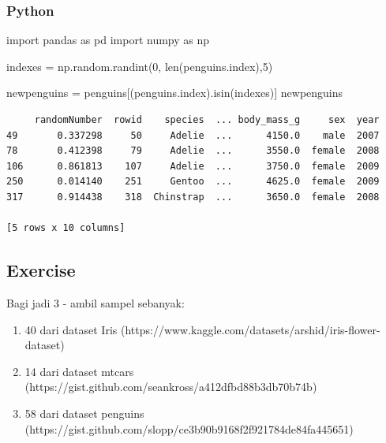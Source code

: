 \documentclass[
  letterpaper,
  DIV=11,
  numbers=noendperiod]{scrreprt}
\newenvironment{Shaded}{\begin{snugshade}}{\end{snugshade}}
\newcommand{\BuiltInTok}[1]{\textcolor[rgb]{0.00,0.23,0.31}{#1}}
\newcommand{\DecValTok}[1]{\textcolor[rgb]{0.68,0.00,0.00}{#1}}
\newcommand{\ImportTok}[1]{\textcolor[rgb]{0.00,0.46,0.62}{#1}}
\newcommand{\NormalTok}[1]{\textcolor[rgb]{0.00,0.23,0.31}{#1}}
\newcommand{\OperatorTok}[1]{\textcolor[rgb]{0.37,0.37,0.37}{#1}}
\providecommand{\tightlist}{%
  \setlength{\itemsep}{0pt}\setlength{\parskip}{0pt}}\usepackage{longtable,booktabs,array}
\begin{document}
\hypertarget{python-4}{%
\subsubsection{Python}\label{python-4}}

\begin{Shaded}
\begin{Highlighting}[]
\ImportTok{import}\NormalTok{ pandas }\ImportTok{as}\NormalTok{ pd}
\ImportTok{import}\NormalTok{ numpy }\ImportTok{as}\NormalTok{ np}

\NormalTok{indexes }\OperatorTok{=}\NormalTok{ np.random.randint(}\DecValTok{0}\NormalTok{, }\BuiltInTok{len}\NormalTok{(penguins.index),}\DecValTok{5}\NormalTok{)}

\NormalTok{newpenguins }\OperatorTok{=}\NormalTok{ penguins[(penguins.index).isin(indexes)]}
\NormalTok{newpenguins}
\end{Highlighting}
\end{Shaded}

\begin{verbatim}
     randomNumber  rowid    species  ... body_mass_g     sex  year
49       0.337298     50     Adelie  ...      4150.0    male  2007
78       0.412398     79     Adelie  ...      3550.0  female  2008
106      0.861813    107     Adelie  ...      3750.0  female  2009
250      0.014140    251     Gentoo  ...      4625.0  female  2009
317      0.914438    318  Chinstrap  ...      3650.0  female  2008

[5 rows x 10 columns]
\end{verbatim}

\hypertarget{exercise-2}{%
\subsection{Exercise}\label{exercise-2}}

Bagi jadi 3 - ambil sampel sebanyak:

\begin{enumerate}
\def\labelenumi{\arabic{enumi}.}
\tightlist
\item
  40 dari dataset Iris
  (https://www.kaggle.com/datasets/arshid/iris-flower-dataset)
\item
  14 dari dataset mtcars
  (https://gist.github.com/seankross/a412dfbd88b3db70b74b)
\item
  58 dari dataset penguins
  (https://gist.github.com/slopp/ce3b90b9168f2f921784de84fa445651)
\end{enumerate}
\end{document}
